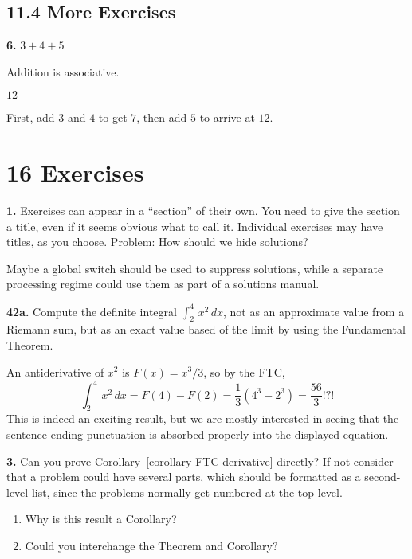 \documentclass[10pt,]{article}
\theoremstyle{plain}
\theoremstyle{definition}
\theoremstyle{definition}
\theoremstyle{definition}
\theoremstyle{definition}
\theoremstyle{definition}
\theoremstyle{definition}
\numberwithin{equation}{section}
\newcommand{\definiteintegral}[4]{\int_{#1}^{#2}\,#3\,d#4}
\begin{document}
\subsection*{11.4 More Exercises}
\noindent\textbf{6.}\quad{}\hypertarget{p-306}{}%
\(3+4+5\)%
\par\smallskip
\hypertarget{p-307}{}%
Addition is associative.%
\par\smallskip
\hypertarget{p-308}{}%
\(12\)%
\par\smallskip
\hypertarget{p-309}{}%
First, add \(3\) and \(4\) to get \(7\), then add \(5\) to arrive at \(12\).%
\par\smallskip
\section*{16 Exercises}
\noindent\textbf{1.}\quad{}\hypertarget{p-506}{}%
Exercises can appear in a ``section'' of their own.  You need to give the section a title, even if it seems obvious what to call it.  Individual exercises may have titles, as you choose.  Problem: How should we hide solutions?%
\par\smallskip
\hypertarget{p-507}{}%
Maybe a global switch should be used to suppress solutions, while a separate processing regime could use them as part of a solutions manual.%
\par\smallskip
\noindent\textbf{42a.}\quad{}\hypertarget{p-508}{}%
Compute the definite integral \(\definiteintegral{2}{4}{x^2}{x}\), not as an approximate value from a Riemann sum, but as an exact value based of the limit by using the Fundamental Theorem.%
\par\smallskip
\hypertarget{p-509}{}%
An antiderivative of \(x^2\) is \(F(x)=x^3/3\), so by the FTC,%
\begin{equation*}
\definiteintegral{2}{4}{x^2}{x}=F(4)-F(2)=\frac{1}{3}\left(4^3-2^3\right)=\frac{56}{3}\text{!?!}
\end{equation*}
This is indeed an exciting result, but we are mostly interested in seeing that the sentence-ending punctuation is absorbed properly into the displayed equation.%
\par\smallskip
\noindent\textbf{3.}\quad{}\hypertarget{p-510}{}%
Can you prove Corollary~\hyperref[corollary-FTC-derivative]{\ref{corollary-FTC-derivative}} directly?  If not consider that a problem could have several parts, which should be formatted as a second-level list, since the problems normally get numbered at the top level.\leavevmode%
\begin{enumerate}[label=(\alph*)]
\item\hypertarget{li-160}{}\hypertarget{p-511}{}%
Why is this result a Corollary?%
\item\hypertarget{li-161}{}\hypertarget{p-512}{}%
Could you interchange the Theorem and Corollary?%
\end{enumerate}
\end{document}
